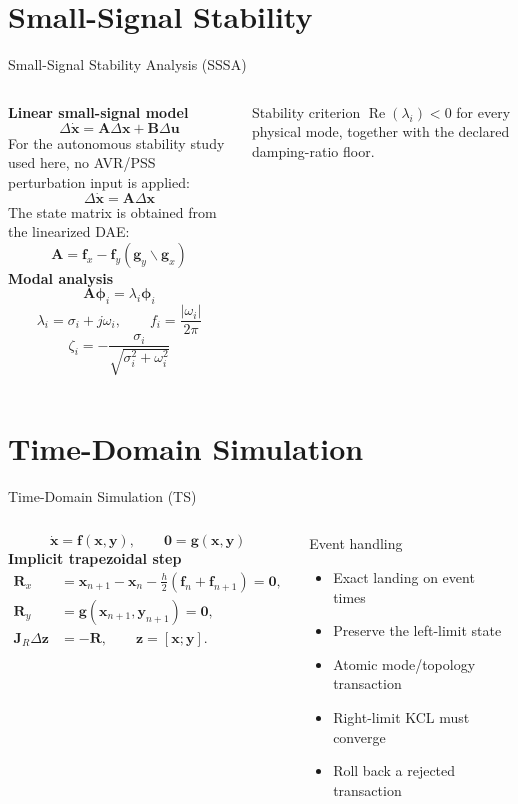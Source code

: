 \documentclass{beamer}
\begin{document}
\section{Small-Signal Stability}
\begin{frame}{Small-Signal Stability Analysis (SSSA)}
\begin{columns}[c,onlytextwidth]
\small
\textbf{Linear small-signal model}
\[
\Delta\dot{\bm x}=\bm A\Delta\bm x+\bm B\Delta\bm u
\]
For the autonomous stability study used here, no AVR/PSS perturbation input is applied:
\[
\boxed{\Delta\dot{\bm x}=\bm A\Delta\bm x}
\]
The state matrix is obtained from the linearized DAE:
\[
\boxed{\bm A=\bm f_x-\bm f_y\left(\bm g_y\backslash\bm g_x\right)}
\]
\small
\textbf{Modal analysis}
\[
\boxed{\bm A\bm\phi_i=\lambda_i\bm\phi_i}
\]
\[
\lambda_i=\sigma_i+j\omega_i,\qquad
f_i=\frac{|\omega_i|}{2\pi}
\]
\[
\zeta_i=-\frac{\sigma_i}{\sqrt{\sigma_i^2+\omega_i^2}}
\]
\begin{block}{Stability criterion}
$\operatorname{Re}(\lambda_i)<0$ for every physical mode, together with the declared damping-ratio floor.
\end{block}
\end{columns}
\end{frame}
\section{Time-Domain Simulation}
\begin{frame}{Time-Domain Simulation (TS)}
\begin{columns}[c,onlytextwidth]
\small
\[ \dot{\bm{x}}=\bm{f}(\bm{x},\bm{y}),\qquad \bm{0}=\bm{g}(\bm{x},\bm{y}) \]
\textbf{Implicit trapezoidal step}
\begin{align*}
\bm{R}_x &= \bm{x}_{n+1}-\bm{x}_{n}-\frac{h}{2}(\bm{f}_{n}+\bm{f}_{n+1})=\bm{0},\\
\bm{R}_y &= \bm{g}(\bm{x}_{n+1},\bm{y}_{n+1})=\bm{0},\\
\boxed{\bm{J}_R\Delta\bm{z}}&=\boxed{-\bm{R}},\qquad \bm{z}=[\bm{x};\bm{y}].
\end{align*}
\small
\begin{block}{Event handling}
\begin{itemize}
  \item Exact landing on event times
  \item Preserve the left-limit state
  \item Atomic mode/topology transaction
  \item Right-limit KCL must converge
  \item Roll back a rejected transaction
\end{itemize}
\end{block}
\end{columns}
\end{frame}
\end{document}
